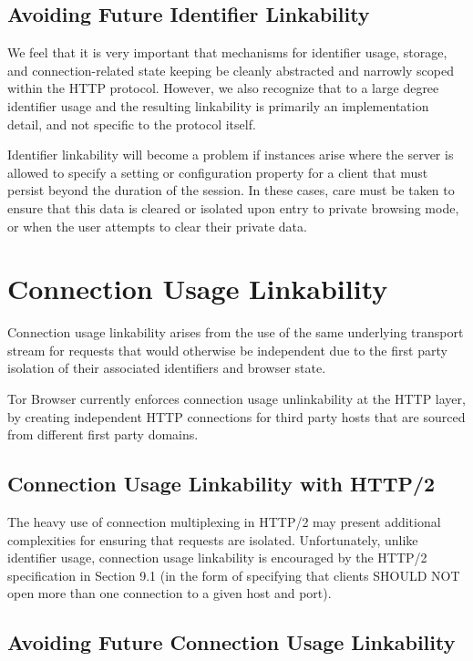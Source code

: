 \documentclass[letterpaper,11pt]{llncs}
\begin{document}
\subsection{Avoiding Future Identifier Linkability}

We feel that it is very important that mechanisms for identifier usage,
storage, and connection-related state keeping be cleanly abstracted and
narrowly scoped within the HTTP protocol. However, we also recognize that to a
large degree identifier usage and the resulting linkability is primarily an
implementation detail, and not specific to the protocol itself.

Identifier linkability will become a problem if instances arise where the
server is allowed to specify a setting or configuration property for a client
that must persist beyond the duration of the session. In these cases, care
must be taken to ensure that this data is cleared or isolated upon entry to
private browsing mode, or when the user attempts to clear their private data.


\section{Connection Usage Linkability}

Connection usage linkability arises from the use of the same underlying
transport stream for requests that would otherwise be independent due to the
first party isolation of their associated identifiers and browser state.

Tor Browser currently enforces connection usage unlinkability at the HTTP
layer, by creating independent HTTP connections for third party hosts that
are sourced from different first party domains.

\subsection{Connection Usage Linkability with HTTP/2}

The heavy use of connection multiplexing in HTTP/2 may present additional
complexities for ensuring that requests are isolated. Unfortunately, unlike
identifier usage, connection usage linkability is encouraged by the
HTTP/2 specification in Section 9.1 (in the form of specifying that clients
SHOULD NOT open more than one connection to a given host and port).

\subsection{Avoiding Future Connection Usage Linkability}
\end{document}
